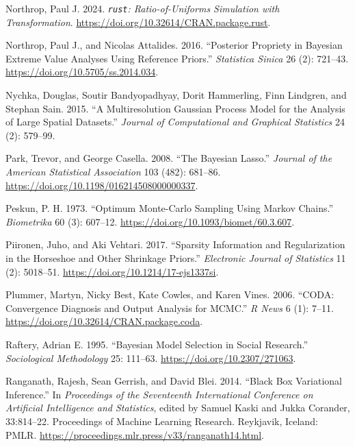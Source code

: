\documentclass[
  11pt,
  letterpaper,
]{scrbook}
\newlength{\cslhangindent}
\newenvironment{CSLReferences}[2] %
 {\begin{list}{}{%
  \setlength{\itemindent}{0pt}
  \setlength{\leftmargin}{0pt}
  \setlength{\parsep}{0pt}
  \ifodd #1
   \setlength{\leftmargin}{\cslhangindent}
   \setlength{\itemindent}{-1\cslhangindent}
  \fi
  \setlength{\itemsep}{#2\baselineskip}}}
 {\end{list}}
\theoremstyle{plain}
\theoremstyle{plain}
\theoremstyle{definition}
\theoremstyle{definition}
\theoremstyle{definition}
\theoremstyle{plain}
\theoremstyle{remark}
\begin{document}
\begin{CSLReferences}{1}{0}
Northrop, Paul J. 2024. \emph{\texttt{rust}: Ratio-of-Uniforms
Simulation with Transformation}.
\url{https://doi.org/10.32614/CRAN.package.rust}.

Northrop, Paul J., and Nicolas Attalides. 2016. {``Posterior Propriety
in {B}ayesian Extreme Value Analyses Using Reference Priors.''}
\emph{Statistica Sinica} 26 (2): 721--43.
\url{https://doi.org/10.5705/ss.2014.034}.

Nychka, Douglas, Soutir Bandyopadhyay, Dorit Hammerling, Finn Lindgren,
and Stephan Sain. 2015. {``A Multiresolution {G}aussian Process Model
for the Analysis of Large Spatial Datasets.''} \emph{Journal of
Computational and Graphical Statistics} 24 (2): 579--99.

Park, Trevor, and George Casella. 2008. {``The {B}ayesian {L}asso.''}
\emph{Journal of the American Statistical Association} 103 (482):
681--86. \url{https://doi.org/10.1198/016214508000000337}.

Peskun, P. H. 1973. {``Optimum {M}onte-{C}arlo Sampling Using {M}arkov
Chains.''} \emph{Biometrika} 60 (3): 607--12.
\url{https://doi.org/10.1093/biomet/60.3.607}.

Piironen, Juho, and Aki Vehtari. 2017. {``Sparsity Information and
Regularization in the Horseshoe and Other Shrinkage Priors.''}
\emph{Electronic Journal of Statistics} 11 (2): 5018--51.
\url{https://doi.org/10.1214/17-ejs1337si}.

Plummer, Martyn, Nicky Best, Kate Cowles, and Karen Vines. 2006.
{``{CODA}: Convergence Diagnosis and Output Analysis for {MCMC}.''}
\emph{R News} 6 (1): 7--11.
\url{https://doi.org/10.32614/CRAN.package.coda}.

Raftery, Adrian E. 1995. {``Bayesian Model Selection in Social
Research.''} \emph{Sociological Methodology} 25: 111--63.
\url{https://doi.org/10.2307/271063}.

Ranganath, Rajesh, Sean Gerrish, and David Blei. 2014. {``{Black Box
Variational Inference}.''} In \emph{Proceedings of the Seventeenth
International Conference on Artificial Intelligence and Statistics},
edited by Samuel Kaski and Jukka Corander, 33:814--22. Proceedings of
Machine Learning Research. Reykjavik, Iceland: PMLR.
\url{https://proceedings.mlr.press/v33/ranganath14.html}.


\end{CSLReferences}
\end{document}
